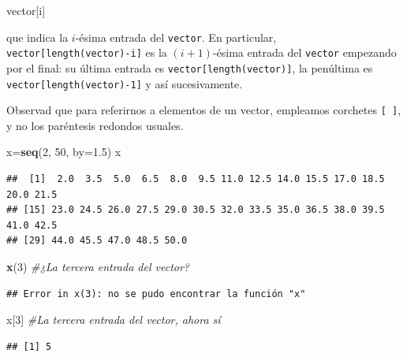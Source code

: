 \documentclass[]{book}
\newenvironment{Shaded}{\begin{snugshade}}{\end{snugshade}}
\newcommand{\CommentTok}[1]{\textcolor[rgb]{0.56,0.35,0.01}{\textit{#1}}}
\newcommand{\DataTypeTok}[1]{\textcolor[rgb]{0.13,0.29,0.53}{#1}}
\newcommand{\DecValTok}[1]{\textcolor[rgb]{0.00,0.00,0.81}{#1}}
\newcommand{\FloatTok}[1]{\textcolor[rgb]{0.00,0.00,0.81}{#1}}
\newcommand{\KeywordTok}[1]{\textcolor[rgb]{0.13,0.29,0.53}{\textbf{#1}}}
\newcommand{\NormalTok}[1]{#1}
\theoremstyle{definition}
\theoremstyle{definition}
\theoremstyle{definition}
\theoremstyle{remark}
\begin{document}
\begin{Shaded}
\begin{Highlighting}[]
\NormalTok{vector[i]}
\end{Highlighting}
\end{Shaded}

que indica la \(i\)-ésima entrada del \texttt{vector}. En particular, \texttt{vector{[}length(vector)-i{]}} es la \((i+1)\)-ésima entrada del \texttt{vector} empezando por el final: su última entrada es \texttt{vector{[}length(vector){]}}, la penúltima es \texttt{vector{[}length(vector)-1{]}} y así sucesivamente.

Observad que para referirnos a elementos de un vector, empleamos corchetes \texttt{{[}\ {]}}, y no los paréntesis redondos usuales.

\begin{Shaded}
\begin{Highlighting}[]
\NormalTok{x=}\KeywordTok{seq}\NormalTok{(}\DecValTok{2}\NormalTok{, }\DecValTok{50}\NormalTok{, }\DataTypeTok{by=}\FloatTok{1.5}\NormalTok{)}
\NormalTok{x}
\end{Highlighting}
\end{Shaded}

\begin{verbatim}
##  [1]  2.0  3.5  5.0  6.5  8.0  9.5 11.0 12.5 14.0 15.5 17.0 18.5 20.0 21.5
## [15] 23.0 24.5 26.0 27.5 29.0 30.5 32.0 33.5 35.0 36.5 38.0 39.5 41.0 42.5
## [29] 44.0 45.5 47.0 48.5 50.0
\end{verbatim}

\begin{Shaded}
\begin{Highlighting}[]
\KeywordTok{x}\NormalTok{(}\DecValTok{3}\NormalTok{) }\CommentTok{#¿La tercera entrada del vector?}
\end{Highlighting}
\end{Shaded}

\begin{verbatim}
## Error in x(3): no se pudo encontrar la función "x"
\end{verbatim}

\begin{Shaded}
\begin{Highlighting}[]
\NormalTok{x[}\DecValTok{3}\NormalTok{] }\CommentTok{#La tercera entrada del vector, ahora sí}
\end{Highlighting}
\end{Shaded}

\begin{verbatim}
## [1] 5
\end{verbatim}
\end{document}

